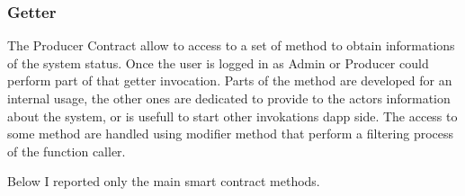 \subsubsection{Getter}

The Producer Contract allow to access to a set of method to obtain informations of the system status.
Once the user is logged in as Admin or Producer could perform part of that getter invocation.
Parts of the method are developed for an internal usage, the other ones are dedicated
to provide to the actors information about the system, or is usefull to start other invokations
dapp side. The access to some method are handled using modifier method that perform a filtering
process of the function caller. 
\bigskip 

Below I reported only the main smart contract methods.
\bigskip

